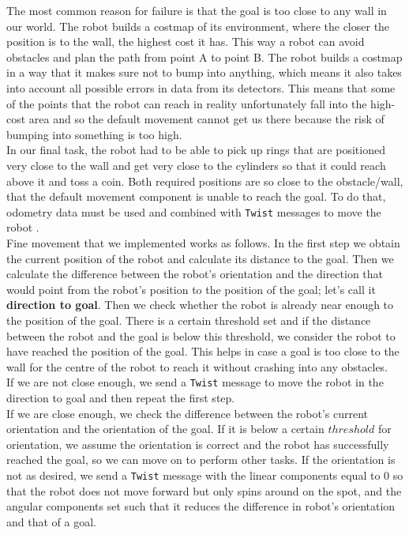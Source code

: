 \documentclass[12pt,a4paper]{article}
\begin{document}
	The most common reason for failure is that the goal is too close to any wall in our world. The robot builds a costmap of its environment, where the closer the position is to the wall, the highest cost it has. This way a robot can avoid obstacles and plan the path from point A to point B. The robot builds a costmap in a way that it makes sure not to bump into anything, which means it also takes into account all possible errors in data from its detectors. This means that some of the points that the robot can reach in reality unfortunately fall into the high-cost area and so the default movement cannot get us there because the risk of bumping into something is too high. \\

	In our final task, the robot had to be able to pick up rings that are positioned very close to the wall and get very close to the cylinders so that it could reach above it and toss a coin. Both required positions are so close to the obstacle/wall, that the default movement component is unable to reach the goal. To do that, odometry data must be used and combined with \texttt{Twist} messages to move the robot . \\

	Fine movement that we implemented works as follows. In the first step we obtain the current position of the robot and calculate its distance to the goal. Then we calculate the difference between the robot's orientation and the direction that would point from the robot's position to the position of the goal; let's call it \textbf{direction to goal}. Then we check whether the robot is already near enough to the position of the goal. There is a certain threshold set and if the distance between the robot and the goal is below this threshold, we consider the robot to have reached the position of the goal. This helps in case a goal is too close to the wall for the centre of the robot to reach it without crashing into any obstacles. \\
	
	If we are not close enough, we send a \texttt{Twist} message to move the robot in the direction to goal and then repeat the first step. \\
	
	If we are close enough, we check the difference between the robot's current orientation and the orientation of the goal. If it is below a certain $threshold$ for orientation, we assume the orientation is correct and the robot has successfully reached the goal, so we can move on to perform other tasks. If the orientation is not as desired, we send a \texttt{Twist} message with the linear components equal to 0 so that the robot does not move forward but only spins around on the spot, and the angular components set such that it reduces the difference in robot's orientation and that of a goal. \\
\end{document}
